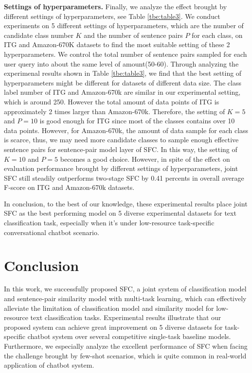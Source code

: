 \documentclass[letterpaper]{article} %
\begin{document}
  \textbf{Settings  of  hyperparameters.} Finally, we analyze the effect brought
  by  different  settings  of  hyperparameters,  see  Table \ref{tbe:table3}. We
  conduct  experiments on 5 different settings of hyperparameters, which are the
  number  of candidate class number $K$ and the number of sentence pairs $P$ for
  each  class, on ITG and Amazon-670K datasets to find the most suitable setting
  of  these  2  hyperparameters.  We  control the total number of sentence pairs
  sampled  for  each  user  query  into  about  the same level of amount(50-60).
  Through  analyzing the experimenal results shown in Table \ref{tbe:table3}, we
  find  that the best setting of hyperparameters might be different for
  datasets of different data size. The class label number of ITG and Amazon-670k
  are  similar  in  our  experimental  setting, which is around 250. However the
  total  amount  of  data  points  of  ITG  is approximately 2 times larger than
  Amazon-670k. Therefore, the setting of $K=5$ and $P=10$ is good enough for ITG
  since  most  of  the  classes  contains  over  10  data  points.  However, for
  Amazon-670k,  the amount of data sample for each class is scarce, thus, we may
  need  more  candidate  classes  to  sample enough effective sentence pairs for
  sentence-pair model layer of SFC. In this way, the setting of $K=10$ and $P=5$
  becomes a good choice. However, in spite of the effect on evaluation performance brought by different settings of hyperparameters, joint SFC still steadily outperforms two-stage SFC by 0.41 percents in overall average F-score on ITG and Amazon-670k datasets. 

  In  conclusion,  to  the best of our knowledge, these experimental results place joint SFC as the
  best   performing   model   on   5  diverse  experimental  datasets  for  text
  classification  task, especially when it's under  low-resource task-specific conversational chatbot
  scenario.

  \section{Conclusion}
  In  this  work, we successfully proposed SFC, a joint system of classification
  model  and  sentence-pair similarity model with multi-task learning, which can
  effectively  alleviate  the  limitation of classification model and similarity
  model   for  low-resource  text  classification  tasks.  Experimental  results
  illustrate that our proposed system can achieve great improvement on 5 diverse
  datasets for task-specific chatbot system over several competitive single-task
  baseline  models. Furthermore, we especially analyze the excellent performance
  of SFC when facing the challenge brought by few-shot scenarios, which is quite
  common in real-world application of chatbot system.

  
  
\end{document}
